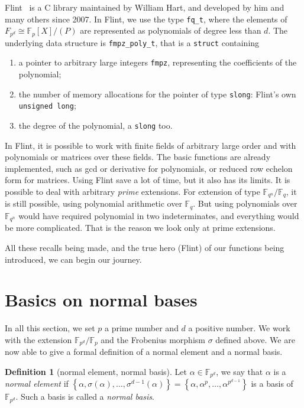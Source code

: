 \documentclass[a4paper,11pt]{article}
\theoremstyle{break}
\theoremstyle{sc}
\theoremstyle{definition}
\newtheorem{defi}[thm]{Definition}
\theoremstyle{remark}
\begin{document}
Flint~\cite{Ha10} is a C library maintained by William Hart, and developed
by him and many others since 2007. In Flint, we use the type
\texttt{fq\_t}, where the elements of $F_{p^d}\cong\mathbb{F}_p[X]/(P)$ are
represented as polynomials of degree less than $d$. The underlying data
structure is \texttt{fmpz\_poly\_t}, that is a \texttt{struct} containing
\begin{enumerate}
  \item a pointer to arbitrary large integers \texttt{fmpz}, representing the
    coefficients of the polynomial;
  \item the number of memory allocations for the pointer of type
    \texttt{slong}: Flint's own \texttt{unsigned long};
  \item the degree of the polynomial, a \texttt{slong} too.
\end{enumerate}
In Flint, it is possible to work with finite fields of arbitrary large
order and with polynomials or matrices over these fields. The basic functions
are already implemented, such as gcd or derivative for polynomials, or reduced
row echelon form for matrices. Using Flint save a lot of time, but it also has
its limits. It is possible to deal with arbitrary \emph{prime}
extensions. For extension of type $\mathbb{F}_{q^n}/\mathbb{F}_q$, it is still
possible, using polynomial arithmetic over $\mathbb{F}_q$. But using
polynomials
over $\mathbb{F}_{q^n}$ would have required polynomial in two
indeterminates, and everything would be more complicated. That is the reason we
look only at prime extensions.

All these recalls being made, and the true hero
(Flint) of our functions being introduced, we can begin our journey.

\section{Basics on normal bases}

In all this section, we set $p$ a prime number and $d$ a positive number. We
work with the extension $\mathbb{F}_{p^d}/\mathbb{F}_p$ and the Frobenius
morphism $\sigma$ defined above. We are now able to give a formal definition
of a normal element and a normal basis.

\begin{defi}[normal element, normal basis]
  Let $\alpha\in\mathbb{F}_{p^d}$, we say that $\alpha$ is a \emph{normal
  element} if $\left\{ \alpha, \sigma(\alpha),\dots,\sigma^{d-1}(\alpha)
  \right\}=\left\{ \alpha, \alpha^{p}, \dots, \alpha^{p^{d-1}} \right\}$ is a
  basis of $\mathbb{F}_{p^d}$. Such a basis is called a \emph{normal basis}. 
\end{defi}
\end{document}
